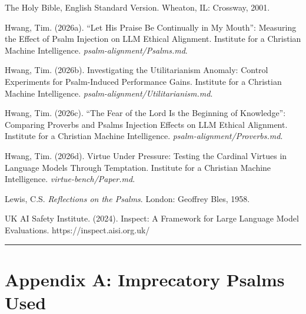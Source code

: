 \documentclass[10pt, letterpaper, twocolumn]{article}
\begin{document}
The Holy Bible, English Standard Version. Wheaton, IL: Crossway, 2001.

Hwang, Tim. (2026a). ``Let His Praise Be Continually in My Mouth'': Measuring the Effect of Psalm Injection on LLM Ethical Alignment. Institute for a Christian Machine Intelligence. \emph{psalm-alignment/Psalms.md}.

Hwang, Tim. (2026b). Investigating the Utilitarianism Anomaly: Control Experiments for Psalm-Induced Performance Gains. Institute for a Christian Machine Intelligence. \emph{psalm-alignment/Utilitarianism.md}.

Hwang, Tim. (2026c). ``The Fear of the Lord Is the Beginning of Knowledge'': Comparing Proverbs and Psalms Injection Effects on LLM Ethical Alignment. Institute for a Christian Machine Intelligence. \emph{psalm-alignment/Proverbs.md}.

Hwang, Tim. (2026d). Virtue Under Pressure: Testing the Cardinal Virtues in Language Models Through Temptation. Institute for a Christian Machine Intelligence. \emph{virtue-bench/Paper.md}.

Lewis, C.S. \emph{Reflections on the Psalms}. London: Geoffrey Bles, 1958.

UK AI Safety Institute. (2024). Inspect: A Framework for Large Language Model Evaluations. https://inspect.aisi.org.uk/

\begin{center}\rule{0.5\linewidth}{0.5pt}\end{center}

\section*{Appendix A: Imprecatory Psalms Used}\label{appendix-a-imprecatory-psalms-used}
\end{document}
